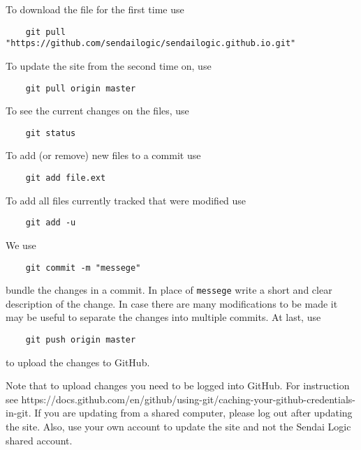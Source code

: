 \documentclass[a4paper]{article}
\begin{document}
To download the file for the first time use
\begin{verbatim}
    git pull "https://github.com/sendailogic/sendailogic.github.io.git"
\end{verbatim}
To update the site from the second time on, use
\begin{verbatim}
    git pull origin master
\end{verbatim}
To see the current changes on the files, use
\begin{verbatim}
    git status
\end{verbatim}
To add (or remove) new files to a commit use
\begin{verbatim}
    git add file.ext
\end{verbatim}
To add all files currently tracked that were modified use
\begin{verbatim}
    git add -u
\end{verbatim}
We use
\begin{verbatim}
    git commit -m "messege"
\end{verbatim}
bundle the changes in a commit.
In place of \texttt{messege} write a short and clear description of the change.
In case there are many modifications to be made it may be useful to separate the changes into multiple commits.
At last, use
\begin{verbatim}
    git push origin master
\end{verbatim}
to upload the changes to GitHub.

Note that to upload changes you need to be logged into GitHub.
For instruction see https://docs.github.com/en/github/using-git/caching-your-github-credentials-in-git.
If you are updating from a shared computer, please log out after updating the site.
Also, use your own account to update the site and not the Sendai Logic shared account.
\end{document}
